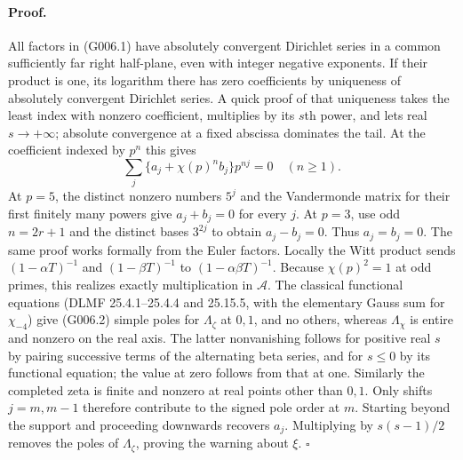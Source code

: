 \paragraph{Proof.}
All factors in (G006.1) have absolutely convergent Dirichlet
series in a common sufficiently far right half-plane, even with
integer negative exponents. If their product is one, its logarithm
there has zero coefficients by uniqueness of absolutely convergent
Dirichlet series. A quick proof of that uniqueness takes the least
index with nonzero coefficient, multiplies by its $s$th power,
and lets real $s\to+\infty$; absolute convergence at a fixed
abscissa dominates the tail. At the coefficient indexed by $p^n$
this gives
\[
 \sum_j\{a_j+\chi(p)^n b_j\}p^{nj}=0\quad(n\ge1).
\]
At $p=5$, the distinct nonzero numbers $5^j$ and the Vandermonde
matrix for their first finitely many powers give $a_j+b_j=0$
for every $j$. At $p=3$, use odd $n=2r+1$ and the distinct bases
$3^{2j}$ to obtain $a_j-b_j=0$. Thus $a_j=b_j=0$. The same proof
works formally from the Euler factors.
Locally the Witt product sends
$(1-\alpha T)^{-1}$ and $(1-\beta T)^{-1}$ to
$(1-\alpha\beta T)^{-1}$. Because $\chi(p)^2=1$ at odd primes,
this realizes exactly multiplication in $\mathcal A$.
The classical functional equations (DLMF 25.4.1--25.4.4 and
25.15.5, with the elementary Gauss sum for $\chi_{-4}$) give
(G006.2) simple poles for
$\Lambda_\zeta$ at $0,1$, and no others, whereas $\Lambda_\chi$
is entire and nonzero on the real axis. The latter nonvanishing
follows for positive real $s$ by pairing successive terms of the
alternating beta series, and for $s\le0$ by its functional equation;
the value at zero follows from that at one. Similarly the completed
zeta is finite and nonzero at real points other than $0,1$.
Only shifts $j=m,m-1$ therefore contribute to the signed pole order
at $m$. Starting beyond the support and proceeding downwards
recovers $a_j$. Multiplying by $s(s-1)/2$ removes the poles of
$\Lambda_\zeta$, proving the warning about $\xi$.
\hfill$\square$

